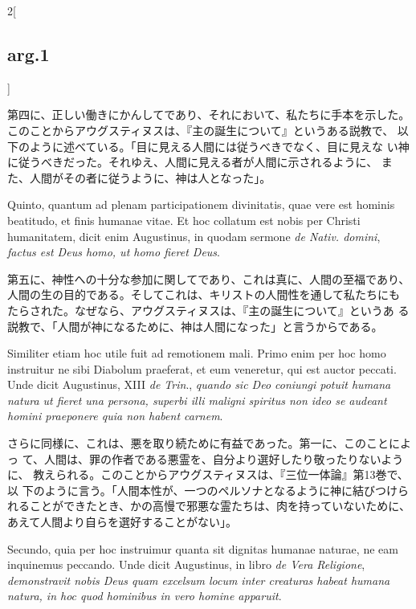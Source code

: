 \documentclass[paper=a4paper,fontsize=10pt,jafontsize=9pt,titlepage]{jlreq}
\begin{document}
\begin{paracol}{2}[\subsection{arg.1}]
\switchcolumn

第四に、正しい働きにかんしてであり、それにおいて、私たちに手本を示した。
 このことからアウグスティヌスは、『主の誕生について』というある説教で、
 以下のように述べている。「目に見える人間には従うべきでなく、目に見えな
 い神に従うべきだった。それゆえ、人間に見える者が人間に示されるように、
 また、人間がその者に従うように、神は人となった」。

\switchcolumn*

Quinto, quantum ad plenam participationem
 divinitatis, quae vere est hominis beatitudo, et finis humanae
 vitae. Et hoc collatum est nobis per Christi humanitatem, dicit enim
 Augustinus, in quodam sermone {\itshape de Nativ. domini}, {\itshape factus est Deus homo,
 ut homo fieret Deus}.

\switchcolumn

第五に、神性への十分な参加に関してであり、これは真に、人間の至福であり、
 人間の生の目的である。そしてこれは、キリストの人間性を通して私たちにも
 たらされた。なぜなら、アウグスティヌスは、『主の誕生について』というあ
 る説教で、「人間が神になるために、神は人間になった」と言うからである。

\switchcolumn*

Similiter etiam hoc utile fuit ad remotionem
 mali. Primo enim per hoc homo instruitur ne sibi Diabolum praeferat, et
 eum veneretur, qui est auctor peccati. Unde dicit Augustinus, XIII {\itshape de
 Trin}., {\itshape quando sic Deo coniungi potuit humana natura ut fieret una
 persona, superbi illi maligni spiritus non ideo se audeant homini
 praeponere quia non habent carnem}.

\switchcolumn

さらに同様に、これは、悪を取り続ために有益であった。第一に、このことによっ
 て、人間は、罪の作者である悪霊を、自分より選好したり敬ったりないように、
 教えられる。このことからアウグスティヌスは、『三位一体論』第13巻で、以
 下のように言う。「人間本性が、一つのペルソナとなるように神に結びつけら
 れることができたとき、かの高慢で邪悪な霊たちは、肉を持っていないために、
 あえて人間より自らを選好することがない」。

\switchcolumn*

Secundo, quia per hoc instruimur
 quanta sit dignitas humanae naturae, ne eam inquinemus peccando. Unde
 dicit Augustinus, in libro {\itshape de Vera Religione}, {\itshape demonstravit nobis Deus
 quam excelsum locum inter creaturas habeat humana natura, in hoc quod
 hominibus in vero homine apparuit}.

\switchcolumn


\end{paracol}
\end{document}
